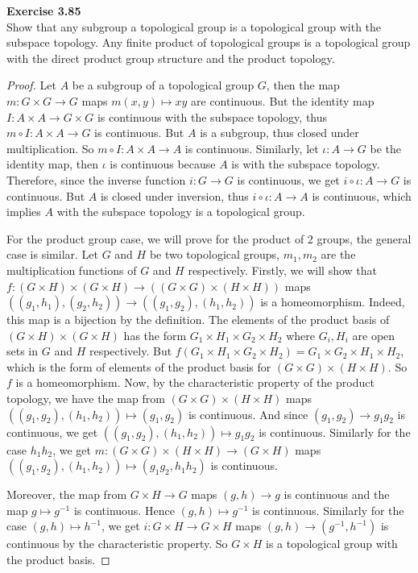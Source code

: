 \documentclass[12pt, a4paper]{article}
\theoremstyle{plain}
\newenvironment{exercise}[2][Exercise]
    { \begin{mdframed}[backgroundcolor=gray!20] \textbf{#1 #2} \\}
    {  \end{mdframed}}
\begin{document}
\begin{exercise}{3.85}
Show that any subgroup a topological group is a topological group with the subspace topology. Any finite product of topological groups is a topological group with the direct product group structure and the product topology.
\end{exercise}
	\begin{proof}
	Let $A$ be a subgroup of a topological group $G$, then the map $m:G\times G\rightarrow G$ maps $m(x,y)\mapsto xy$ are continuous. But the identity map $I:A\times A\rightarrow G\times G$ is continuous with the subspace topology, thus $m\circ I:A\times A\rightarrow G$ is continuous. But $A$ is a subgroup, thus closed under multiplication. So $m\circ I:A\times A\rightarrow A$ is continuous. Similarly, let $\iota:A\rightarrow G$ be the identity map, then $\iota$ is continuous because $A$ is with the subspace topology. Therefore, since the inverse function $i:G\rightarrow G$ is continuous, we get $i\circ \iota:A\rightarrow G$ is continuous. But $A$ is closed under inversion, thus $i\circ\iota: A\rightarrow A$ is continuous, which implies $A$ with the subspace topology is a topological group.
	
	For the product group case, we will prove for the product of 2 groups, the general case is similar. Let $G$ and $H$ be two topological groups, $m_1,m_2$ are the multiplication functions of $G$ and $H$ respectively. Firstly, we will show that $f:(G\times H)\times (G\times H)\rightarrow ((G\times G)\times (H\times H))$ maps $((g_1,h_1),(g_2,h_2))\rightarrow ((g_1,g_2),(h_1,h_2))$ is a homeomorphism. Indeed, this map is a bijection by the definition. The elements of the product basis of $(G\times H)\times (G\times H)$ has the form $G_1\times H_1\times G_2\times H_2$ where $G_i,H_i$ are open sets in $G$ and $H$ respectively. But $f(G_1\times H_1\times G_2\times H_2)=G_1\times G_2\times H_1\times H_2$, which is the form of elements of the product basis for $(G\times G)\times (H\times H)$. So $f$ is a homeomorphism. Now, by the characteristic property of the product topology, we have the map from $(G\times G)\times(H\times H)$ maps $((g_1,g_2),(h_1,h_2))\mapsto (g_1,g_2)$ is continuous. And since $(g_1,g_2)\rightarrow g_1g_2$ is continuous, we get $((g_1,g_2),(h_1,h_2))\mapsto g_1g_2$ is continuous. Similarly for the case $h_1h_2$, we get $m:(G\times G)\times (H\times H)\rightarrow (G\times H)$ maps $((g_1,g_2),(h_1,h_2))\mapsto (g_1g_2,h_1h_2)$ is continuous.
	
	Moreover, the map from $G\times H\rightarrow G$ maps $(g,h)\rightarrow g$ is continuous and the map $g\mapsto g^{-1}$ is continuous. Hence $(g,h)\mapsto g^{-1}$ is continuous. Similarly for the case $(g,h)\mapsto h^{-1}$, we get $i:G\times H\rightarrow G\times H$ maps $(g,h)\rightarrow (g^{-1},h^{-1})$ is continuous by the characteristic property. So $G\times H$ is a topological group with the product basis.
	\end{proof}
\end{document}
